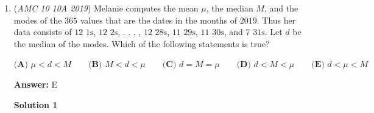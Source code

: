 \begin{enumerate}
 Therefore, the answer is $25 + 16 - 4 = \boxed{\textbf{(C) }37}$




\textbf{Solution 5 (Casework)}

Since we know that $201 = 3 \cdot 67$, $201^9 = 3^9 \cdot 67^9$

 Now, for factoring. The exponents that work are 0, 2, 3, 4, 6, 8, and 9.

 Let's review each case by case.

 Case 1: The power of 3 is a square and a cube, meaning that the exponent is 0 or 6.

 The exponent of 67 can be any number on our list, giving us 7 choices. We have to multiply this by 2 because we have 2 exponents of 3 that fit, giving a total of $14$ for case 1.

 Case 2: The power of 3 is only a square, meaning that the exponent is even but isn't a multiple of 6, so 2, 4, or 8.

 The exponent of 67 can be any even number, so 0, 2, 4, 6, or 8, giving us 5 choices. We multiply this by 3 because we have 3 exponents of 3 that work, so the total for case 2 is $15$.

 Case 3: The power of 3 is only a cube, so the exponent is 3 or 9.

 The exponent of 67 can be 0, 3, 6, or 9, giving us 4 choices. When we multiply by 2, we get a total of $8$ for case 3.

 The total is $14 + 15 + 8 = \boxed{\textbf{(C) }37}$

 Education, the Study of Everything

 


 


	\item (\textit{AMC 10 10A 2019}) Melanie computes the mean $\mu$, the median $M$, and the modes of the $365$ values that are the dates in the months of $2019$. Thus her data consists of $12$ $1\text{s}$, $12$ $2\text{s}$, . . . , $12$ $28\text{s}$, $11$ $29\text{s}$, $11$ $30\text{s}$, and $7$ $31\text{s}$. Let $d$ be the median of the modes. Which of the following statements is true?


 $\textbf{(A) } \mu < d < M \qquad\textbf{(B) } M < d < \mu \qquad\textbf{(C) } d = M =\mu \qquad\textbf{(D) } d < M < \mu \qquad\textbf{(E) } d < \mu < M$

 \textbf{Answer: }E



\textbf{Solution 1}


\end{enumerate}
